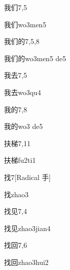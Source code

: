 \begin{entry}{我们}{7,5}
  \begin{phonetics}{我们}{wo3men5}
  \end{phonetics}
\end{entry}

\begin{entry}{我们的}{7,5,8}
  \begin{phonetics}{我们的}{wo3men5 de5}
  \end{phonetics}
\end{entry}

\begin{entry}{我去}{7,5}
  \begin{phonetics}{我去}{wo3qu4}
  \end{phonetics}
\end{entry}

\begin{entry}{我的}{7,8}
  \begin{phonetics}{我的}{wo3 de5}
  \end{phonetics}
\end{entry}

\begin{entry}{扶梯}{7,11}
  \begin{phonetics}{扶梯}{fu2ti1}
  \end{phonetics}
\end{entry}

\begin{entry}{找}{7}[Radical 手]
  \begin{phonetics}{找}{zhao3}
  \end{phonetics}
\end{entry}

\begin{entry}{找见}{7,4}
  \begin{phonetics}{找见}{zhao3jian4}
  \end{phonetics}
\end{entry}

\begin{entry}{找回}{7,6}
  \begin{phonetics}{找回}{zhao3hui2}
  \end{phonetics}
\end{entry}

